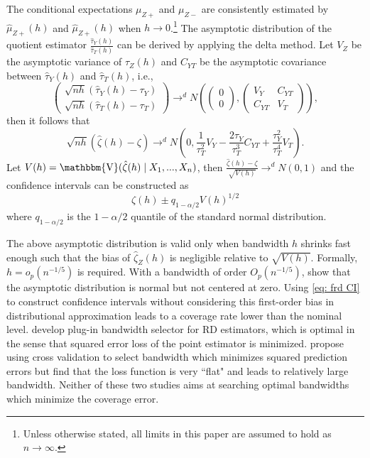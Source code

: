 \documentclass[12pt,]{article}
\DeclareMathOperator{\1}{\mathbbm{1}}
\DeclareMathOperator{\V}{\mathbbm{V}}
\begin{document}
The conditional expectations $\mu_{Z+}$ and $\mu_{Z-}$ are consistently estimated by $\hat {\mu}_{Z+}(h)$ and $\hat {\mu}_{Z+}(h)$ when $h \to 0$.\footnote{Unless otherwise stated, all limits in this paper are assumed to hold as $n \to \infty$.} The asymptotic distribution of the quotient estimator $\frac{\hat \tau_Y (h)}{\hat \tau_T (h)}$ can be derived by applying the delta method. Let $V_Z$ be the asymptotic variance of $\hat \tau_Z(h)$ and $C_{YT}$ be the asymptotic covariance between  $\hat \tau_Y(h)$ and  $\hat \tau_T(h)$, i.e.,
\begin{equation*}
	\left({\begin{array}{*{20}{c}}
		{\sqrt {nh} (\hat \tau_Y(h) - \tau_Y) }\\
		{\sqrt {nh} (\hat \tau_T(h) - \tau_T) }
		\end{array}} \right) \to^d N
	\left( {\left( {\begin{array}{*{20}{c}}
		0\\
		0
		\end{array}} \right),\left( {\begin{array}{*{20}{c}}
		{{V_Y}}&{{C_{YT}}}\\
		{{C_{YT}}}&{{V_T}}
		\end{array}} \right)} \right),
\end{equation*}
then it follows that
\begin{equation*}
	\sqrt{nh} (\hat \zeta (h) - \zeta) \to^d N(0, \frac{1}{\tau_T^2} V_Y - \frac{2 \tau_Y}{\tau_T^3} C_{YT} + \frac{\tau_Y^2}{\tau_T^4} V_T).
\end{equation*}
Let $V(h) = \V (\hat \zeta(h) \mid X_1, ..., X_n)$, then $\frac{\hat \zeta(h) - \zeta}{\sqrt{V(h)}} \to^d N(0,1)$ and the confidence intervals can be constructed as
\begin{equation}
	\label{eq: frd CI}
	\hat{\zeta}(h) \pm q_{1-\alpha/2} V(h)^{1/2}
\end{equation}
where $q_{1 - \alpha/2}$ is the $1 - \alpha/2$ quantile of the standard normal distribution.

The above asymptotic distribution is valid only when bandwidth $h$ shrinks fast enough such that the bias of $\hat \zeta_Z(h)$ is negligible relative to $\sqrt{V(h)}$. Formally, $h=o_p(n^{-1/5})$ is required. With a bandwidth of order $O_p(n^{-1/5})$, \cite{hahn2001identification} show that the asymptotic distribution is normal but not centered at zero. Using \eqref{eq: frd CI} to construct confidence intervals without considering this first-order bias in distributional approximation leads to a coverage rate lower than the nominal level. \cite{imbens2011optimal} develop plug-in bandwidth selector for RD estimators, which is optimal in the sense that squared error loss of the point estimator is minimized. \cite{ludwig2005does} propose using cross validation to select bandwidth which minimizes squared prediction errors but find that the loss function is very ``flat" and leads to relatively large bandwidth. Neither of these two studies aims at searching optimal bandwidths which minimize the coverage error. 
\end{document}
